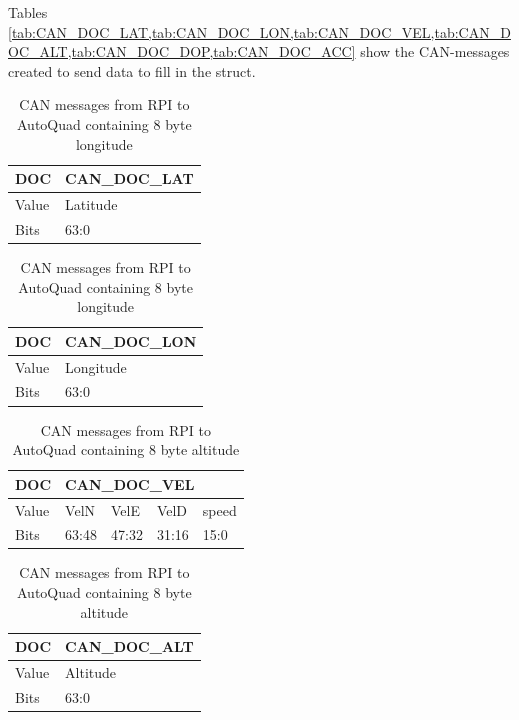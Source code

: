 Tables \cref{tab:CAN_DOC_LAT,tab:CAN_DOC_LON,tab:CAN_DOC_VEL,tab:CAN_DOC_ALT,tab:CAN_DOC_DOP,tab:CAN_DOC_ACC} show the CAN-messages created to send data to fill in the struct.
\begin{multicols}{2}
\begin{table}[H]
	\begin{tabular}{@{}|l|l|@{}}
		\toprule
		DOC   & CAN\_DOC\_LAT \\ \midrule
		Value & Latitude      \\ \midrule
		Bits  & 63:0          \\ \bottomrule
	\end{tabular}
	\caption{CAN messages from RPI to AutoQuad containing 8 byte latitude}	\label{tab:CAN_DOC_LAT}

	\begin{tabular}{@{}|l|l|@{}}
	\toprule
		DOC   & CAN\_DOC\_LON \\ \midrule
		Value & Longitude     \\ \midrule
		Bits  & 63:0          \\ \bottomrule
	\end{tabular}
	\caption{CAN messages from RPI to AutoQuad containing 8 byte longitude} 	\label{tab:CAN_DOC_LON}

\end{table}
\columnbreak
\begin{table}[H]
	\begin{tabular}{@{}|l|l|l|l|l|@{}}
		\toprule
		DOC   & \multicolumn{4}{l|}{CAN\_DOC\_VEL} \\ \midrule
		Value & VelN    & VelE   & VelD   & speed  \\ \midrule
		Bits  & 63:48   & 47:32  & 31:16  & 15:0   \\ \bottomrule
	\end{tabular}
	\caption{CAN messages from RPI to AutoQuad containing velocities each of 2 bytes}
	\label{tab:CAN_DOC_VEL}
	\begin{tabular}{@{}|l|l|@{}}
	\toprule
		DOC   & CAN\_DOC\_ALT \\ \midrule
		Value & Altitude      \\ \midrule
		Bits  & 63:0          \\ \bottomrule
	\end{tabular}
	\caption{CAN messages from RPI to AutoQuad containing 8 byte altitude}
	\label{tab:CAN_DOC_ALT}
\end{table}
\end{multicols}

